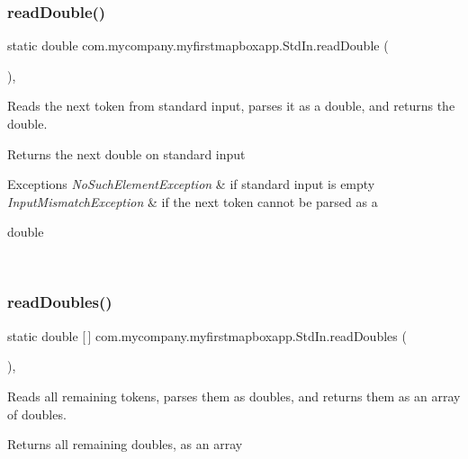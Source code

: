 \subsubsection{\texorpdfstring{read\+Double()}{readDouble()}}
{\footnotesize\ttfamily static double com.\+mycompany.\+myfirstmapboxapp.\+Std\+In.\+read\+Double (\begin{DoxyParamCaption}{ }\end{DoxyParamCaption})\hspace{0.3cm}{\ttfamily [inline]}, {\ttfamily [static]}}

Reads the next token from standard input, parses it as a double, and returns the double.

\begin{DoxyReturn}{Returns}
the next double on standard input 
\end{DoxyReturn}

\begin{DoxyExceptions}{Exceptions}
{\em No\+Such\+Element\+Exception} & if standard input is empty \\
\hline
{\em Input\+Mismatch\+Exception} & if the next token cannot be parsed as a
\begin{DoxyCode}
\textcolor{keywordtype}{double} 
\end{DoxyCode}
 \\
\hline
\end{DoxyExceptions}
\mbox{\label{classcom_1_1mycompany_1_1myfirstmapboxapp_1_1_std_in_af24b495c7569644fb82d5117cae52dd8}} 
\subsubsection{\texorpdfstring{read\+Doubles()}{readDoubles()}}
{\footnotesize\ttfamily static double \mbox{[}$\,$\mbox{]} com.\+mycompany.\+myfirstmapboxapp.\+Std\+In.\+read\+Doubles (\begin{DoxyParamCaption}{ }\end{DoxyParamCaption})\hspace{0.3cm}{\ttfamily [inline]}, {\ttfamily [static]}}

Reads all remaining tokens, parses them as doubles, and returns them as an array of doubles. \begin{DoxyReturn}{Returns}
all remaining doubles, as an array 
\end{DoxyReturn}

